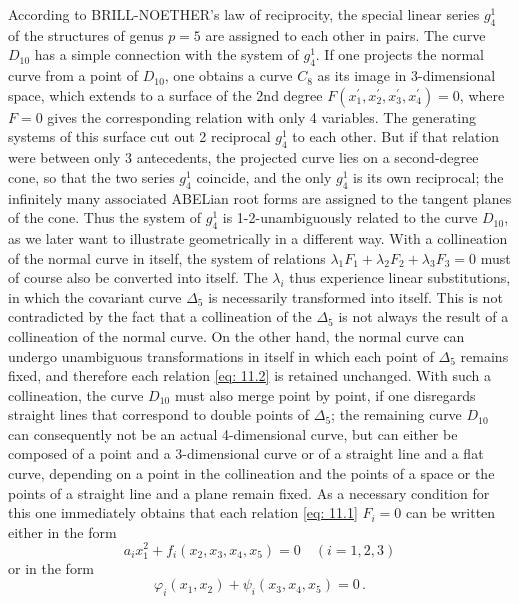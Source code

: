 \documentclass[leqno]{article}
\begin{document}
According to BRILL-NOETHER's law of reciprocity, the special linear series $g_4^1$ of the structures of genus $p=5$ are assigned to each other in pairs. The curve $D_{10}$ has a simple connection with the system of $g_4^1$. If one projects the normal curve from a point of $D_{10}$, one obtains a curve $C_8$ as its image in 3-dimensional space, which extends to a surface of the 2nd degree $F(x_1^\prime, x_2^ \prime, x_3^\prime, x_4^\prime)=0$, where $F=0$ gives the corresponding relation with only 4 variables. The generating systems of this surface cut out 2 reciprocal $g_4^1$ to each other. But if that relation were between only 3 antecedents, the projected curve lies on a second-degree cone, so that the two series $g_4^1$ coincide, and the only $g_4^1$ is its own reciprocal; the infinitely many associated ABELian root forms are assigned to the tangent planes of the cone. Thus the system of $g_4^1$ is 1-2-unambiguously related to the curve $D_{10}$, as we later want to illustrate geometrically in a different way. With a collineation of the normal curve in itself, the system of relations $\lambda_1 F_1 + \lambda_2 F_2 + \lambda_3 F_3=0$ must of course also be converted into itself. The $\lambda_i$ thus experience linear substitutions, in which the covariant curve $\Delta_5$ is necessarily transformed into itself. This is not contradicted by the fact that a collineation of the $\Delta_5$ is not always the result of a collineation of the normal curve. On the other hand, the normal curve can undergo unambiguous transformations in itself in which each point of $\Delta_5$ remains fixed, and therefore each relation \eqref{eq: 11.2} is retained unchanged. With such a collineation, the curve $D_{10}$ must also merge point by point, if one disregards straight lines that correspond to double points of $\Delta_5$; the remaining curve $D_{10}$ can consequently not be an actual 4-dimensional curve, but can either be composed of a point and a 3-dimensional curve or of a straight line and a flat curve, depending on a point in the collineation and the points of a space or the points of a straight line and a plane remain fixed. As a necessary condition for this one immediately obtains that each relation \eqref{eq: 11.1} $F_i=0$ can be written either in the form 
\begin{equation}\label{eq: 11.a}
a_i x_1^2 + f_i(x_2, x_3, x_4, x_5) = 0 \quad (i=1,2,3) \tag{a}
\end{equation} 
or in the form 
\begin{equation}\label{eq: 11.b}
\varphi_i(x_1, x_2) + \psi_i(x_3, x_4, x_5) = 0 \, . \tag{b}
\end{equation} 
\end{document}
